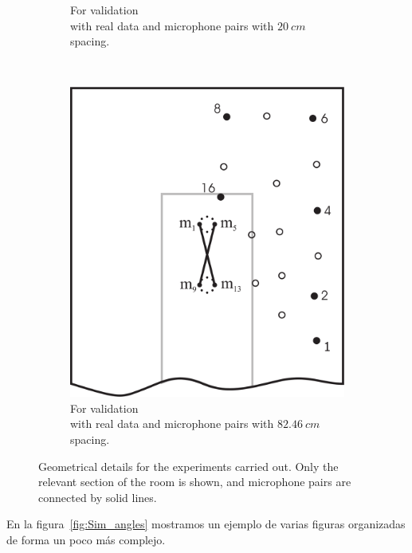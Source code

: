 \documentclass[spanish,openright]{book}
\begin{document}
\begin{figure}
\begin{subfigure}[t]{0.3\textwidth}
    \caption{For validation\\with real data and microphone pairs with $20~cm$ spacing.}
    \label{fig:real_positions_short}
  \end{subfigure}
  ~
  \begin{subfigure}[t]{0.3\textwidth}
    \includegraphics[width=\textwidth]{positions2-short-improved}
    \caption{For validation\\with real data and microphone pairs with
      $82.46~cm$ spacing.}
    \label{fig:real_positions_long}
  \end{subfigure}
  \caption{Geometrical details for the experiments carried out. Only the
    relevant section of the room is shown, and microphone pairs are
    connected by solid lines.}
  \label{fig:simureal_positions}
\end{figure}

En la figura~\ref{fig:Sim_angles} mostramos un ejemplo de varias
figuras organizadas de forma un poco más complejo.
\end{document}
